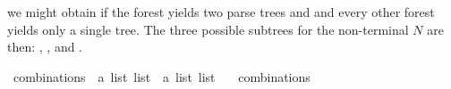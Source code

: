 \begin{isabellebody}
\begin{isamarkuptext}
 we might obtain  if the
forest  yields two parse trees  and  and every other forest yields only
a single tree. The three possible subtrees for the non-terminal $N$ are then: , ,
and .%
\end{isamarkuptext}\isamarkuptrue%
\isamarkupfalse%
\ combinations\ {\isacharcolon}{\kern0pt}{\isacharcolon}{\kern0pt}\ {\isachardoublequoteopen}{\isacharprime}{\kern0pt}a\ list\ list\ {\isasymRightarrow}\ {\isacharprime}{\kern0pt}a\ list\ list{\isachardoublequoteclose}\ \isanewline
\ \ {\isachardoublequoteopen}combinations\ {\isacharbrackleft}{\kern0pt}{\isacharbrackright}{\kern0pt}\ {\isacharequal}{\kern0pt}\ {\isacharbrackleft}{\kern0pt}{\isacharbrackleft}{\kern0pt}{\isacharbrackright}{\kern0pt}{\isacharbrackright}{\kern0pt}{\isachardoublequoteclose}\isanewline

\end{isabellebody}
